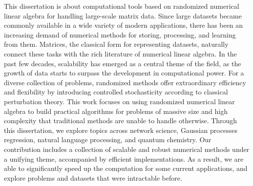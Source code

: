 This dissertation is about computational tools based on randomized numerical
linear algebra for handling large-scale matrix data. Since large datasets became
commonly available in a wide variety of modern applications, there has been an
increasing demand of numerical methods for storing, processing, and learning
from them. Matrices, the classical form for representing datasets, naturally
connect these tasks with the rich literature of numerical linear algebra. In the
past few decades, scalability has emerged as a central theme of the field, as
the growth of data starts to surpass the development in computational power. For
a diverse collection of problems, randomized methods offer extraordinary
efficiency and flexibility by introducing controlled stochasticity according to
classical perturbation theory. This work focuses on using randomized
numerical linear algebra to build practical algorithms for problems of massive
size and high complexity that traditional methods are unable to handle
otherwise. Through this dissertation, we explore topics across network science,
Gaussian processes regression, natural language processing, and quantum
chemistry. Our contribution includes a collection of scalable and robust
numerical methods under a unifying theme, accompanied by efficient
implementations. As a result, we are able to significantly speed up the
computation for some current applications, and explore problems and datasets
that were intractable before.
